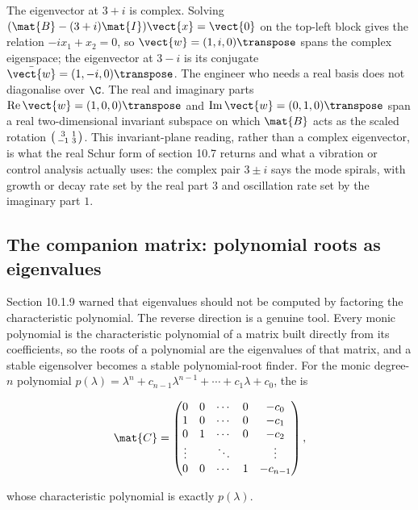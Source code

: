 The eigenvector at $3 + i$ is complex. Solving $(\mat{B} - (3 + i)
\mat{I})\vect{x} = \vect{0}$ on the top-left block gives the relation
$-i x_{1} + x_{2} = 0$, so $\vect{w} = (1, i, 0)\transpose$ spans the
complex eigenspace; the eigenvector at $3 - i$ is its conjugate
$\bar{\vect{w}} = (1, -i, 0)\transpose$. The engineer who needs a
real basis does not diagonalise over $\C$. The real and imaginary
parts $\operatorname{Re}\vect{w} = (1, 0, 0)\transpose$ and
$\operatorname{Im}\vect{w} = (0, 1, 0)\transpose$ span a real
two-dimensional invariant subspace on which $\mat{B}$ acts as the
scaled rotation $\begin{psmallmatrix} 3 & 1 \\ -1 & 3
\end{psmallmatrix}$. This invariant-plane reading, rather than a
complex eigenvector, is what the real Schur form of section 10.7
returns and what a vibration or control analysis actually uses: the
complex pair $3 \pm i$ says the mode spirals, with growth or decay
rate set by the real part $3$ and oscillation rate set by the
imaginary part $1$.

\subsection{The companion matrix: polynomial roots as eigenvalues}

Section 10.1.9 warned that eigenvalues should not be computed by
factoring the characteristic polynomial. The reverse direction is a
genuine tool. Every monic polynomial is the characteristic polynomial
of a matrix built directly from its coefficients, so the roots of a
polynomial are the eigenvalues of that matrix, and a stable eigensolver
becomes a stable polynomial-root finder. For the monic degree-$n$
polynomial $p(\lambda) = \lambda^{n} + c_{n-1}\lambda^{n-1} + \cdots +
c_{1}\lambda + c_{0}$, the  is

\[
\mat{C} = \begin{pmatrix}
0 & 0 & \cdots & 0 & -c_{0} \\
1 & 0 & \cdots & 0 & -c_{1} \\
0 & 1 & \cdots & 0 & -c_{2} \\
\vdots & & \ddots & & \vdots \\
0 & 0 & \cdots & 1 & -c_{n-1}
\end{pmatrix},
\]

whose characteristic polynomial is exactly $p(\lambda)$.

